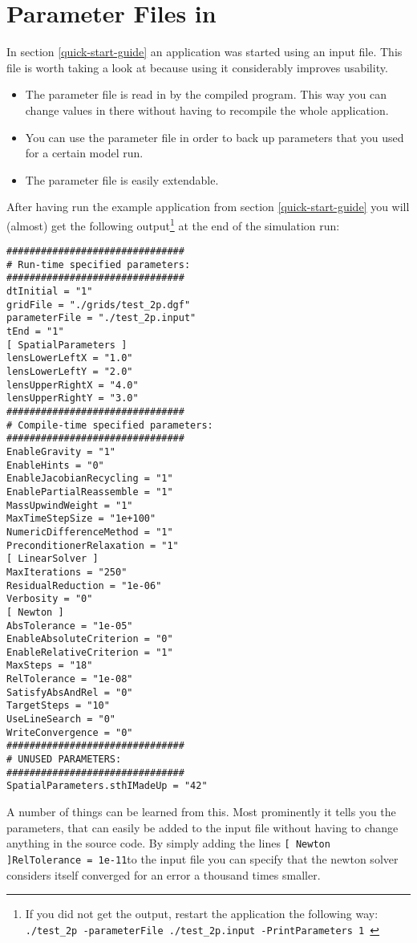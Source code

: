 \section{Parameter Files in \Dumux}
\label{sec:inputFiles}
In section \ref{quick-start-guide} an application was started using an input file. 
This file is worth taking a look at because using it considerably improves usability. 

\begin{itemize}
 \item The parameter file is read in by the compiled program. This way you can change 
values in there without having to recompile the whole application. 
\item You can use the parameter file in order to back up parameters that you used for a certain model run. 
\item The parameter file is easily extendable. 
\end{itemize}

After having run the example application from  section \ref{quick-start-guide} you will (almost) get the following output\footnote{If you did not get the output, restart the application the following way:
  \texttt{./test{\_}2p -parameterFile ./test\_2p.input -PrintParameters 1 }} at the end of the simulation run:
\begin{lstlisting}[style=Bash]
###############################
# Run-time specified parameters:
###############################
dtInitial = "1"
gridFile = "./grids/test_2p.dgf"
parameterFile = "./test_2p.input"
tEnd = "1"
[ SpatialParameters ]
lensLowerLeftX = "1.0"
lensLowerLeftY = "2.0"
lensUpperRightX = "4.0"
lensUpperRightY = "3.0"
###############################
# Compile-time specified parameters:
###############################
EnableGravity = "1"
EnableHints = "0"
EnableJacobianRecycling = "1"
EnablePartialReassemble = "1"
MassUpwindWeight = "1"
MaxTimeStepSize = "1e+100"
NumericDifferenceMethod = "1"
PreconditionerRelaxation = "1"
[ LinearSolver ]
MaxIterations = "250"
ResidualReduction = "1e-06"
Verbosity = "0"
[ Newton ]
AbsTolerance = "1e-05"
EnableAbsoluteCriterion = "0"
EnableRelativeCriterion = "1"
MaxSteps = "18"
RelTolerance = "1e-08"
SatisfyAbsAndRel = "0"
TargetSteps = "10"
UseLineSearch = "0"
WriteConvergence = "0"
###############################
# UNUSED PARAMETERS:
###############################
SpatialParameters.sthIMadeUp = "42"
\end{lstlisting}

A number of things can be learned from this. Most prominently it tells you the parameters, that can easily be added to the input file without having to change anything in the source code. 
By simply adding the lines  \newline \texttt{[ Newton ]\newline RelTolerance = 1e-11}\newline  to the input file you can specify that the newton solver considers itself converged for an error a thousand times smaller. 


